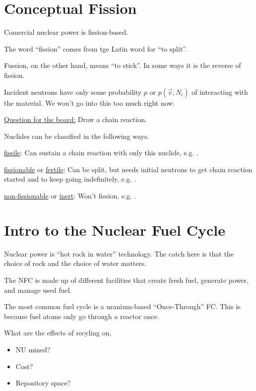 \section{Conceptual Fission}
Comercial nuclear power is fission-based.

The word ``fission'' comes from tge Latin word for ``to split''.





Fussion, on the other hand, means ``to stick''. In some ways it is the reverse of
fission.


Incident neutrons have only some probability $p$ or $p(\vec{v}, N_i)$ of interacting with
the material. We won't go into this too much right now.

\underline{Question for the board:} Draw a chain reaction.

Nuclides can be classified in the following ways.
\begin{labeling}
\item [\underline{fissile}:] Can sustain a chain reaction with only this nuclide, e.g. .
\item [\underline{fissionable} or \underline{fertile}:] Can be split, but needs initial neutrons to get
    chain reaction started and to keep going indefinitely, e.g. .
\item [\underline{non-fissionable} or \underline{inert}:] Won't fission, e.g. .
\end{labeling}

\section{Intro to the Nuclear Fuel Cycle}
Nuclear power is ``hot rock in water'' technology. The catch here is that the choice of rock and the
choice of water matters.

The NFC is made up of different facilities that create fresh fuel, generate power, and manage used fuel.

The most common fuel cycle is a uranium-based ``Once-Through'' FC. This is because fuel atoms only go through
a reactor once.



What are the effects of recyling on,
\begin{itemize}
\item NU mined?
\item Cost?
\item Repository space?
\end{itemize}

